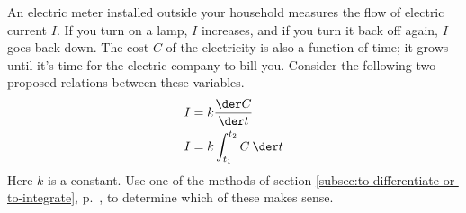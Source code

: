 An electric meter installed outside your household measures the
flow of electric current $I$. If you turn on a lamp, $I$ increases,
and if you turn it back off again, $I$ goes back down.
The cost $C$ of the electricity is also a function of time; it grows
until it's time for the electric company to bill you.
Consider the following
two proposed relations between these variables.
\begin{align*}
  I &= k\frac{\der C}{\der t} \\
  I &= k\int_{t_1}^{t_2} C \: \der t
\end{align*}
Here $k$ is a constant. 
Use one of the methods of section \ref{subsec:to-differentiate-or-to-integrate},
p.~\pageref{subsec:to-differentiate-or-to-integrate}, to determine which of these
makes sense.
